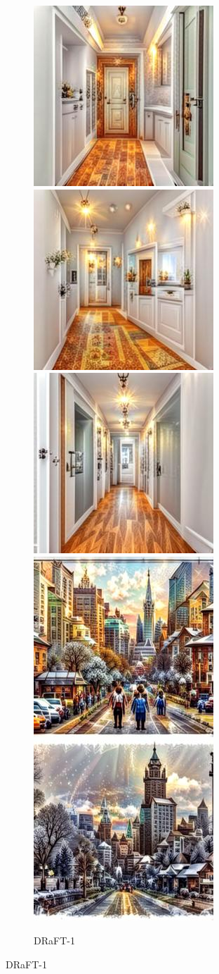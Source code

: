 \begin{figure}[h!]
\begin{subfigure}[t]{0.32\linewidth}
    \end{subfigure}\hfill
    \begin{subfigure}[t]{0.32\linewidth}
    \centering
    \caption*{DRaFT-1}
	\includegraphics[width=0.320\linewidth]{figs/samples_appendix_3/draft1k_cfg_2_ode_prompt_6_image_1.jpg}\;%
	\includegraphics[width=0.320\linewidth]{figs/samples_appendix_3/draft1k_cfg_2_ode_prompt_6_image_2.jpg}\;%
	\includegraphics[width=0.320\linewidth]{figs/samples_appendix_3/draft1k_cfg_2_ode_prompt_6_image_3.jpg}\\ 
	\includegraphics[width=0.320\linewidth]{figs/samples_appendix_3/draft1k_cfg_2_ode_prompt_14_image_1.jpg}\;%
	\includegraphics[width=0.320\linewidth]{figs/samples_appendix_3/draft1k_cfg_2_ode_prompt_14_image_2.jpg}\;%

\end{subfigure}
\end{figure}
